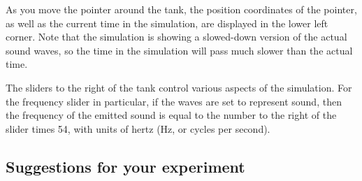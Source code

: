As you move the pointer around the tank, the position coordinates of the pointer, as well as the current time in the simulation, are displayed in the lower left corner.  Note that the simulation is showing a slowed-down version of the actual sound waves, so the time in the simulation will pass much slower than the actual time.

The sliders to the right of the tank control various aspects of the simulation. For the frequency slider in particular, if the waves are set to represent sound, then the frequency of the emitted sound is equal to the number to the right of the slider times 54, with units of hertz (Hz, or cycles per second).


\subsection{Suggestions for your experiment}

